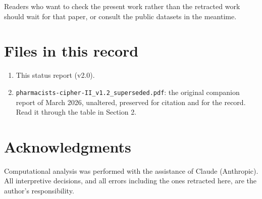 \documentclass[11pt,a4paper]{article}
\begin{document}
Readers who want to check the present work rather than the retracted work should wait for that
paper, or consult the public datasets in the meantime.

\section*{Files in this record}

\begin{enumerate}[leftmargin=1.6em]
\item This status report (v2.0).
\item \texttt{pharmacists-cipher-II\_v1.2\_superseded.pdf}: the original companion report of March
2026, unaltered, preserved for citation and for the record. Read it through the table in Section 2.
\end{enumerate}

\section*{Acknowledgments}

Computational analysis was performed with the assistance of Claude (Anthropic). All interpretive
decisions, and all errors including the ones retracted here, are the author's responsibility.
\end{document}

